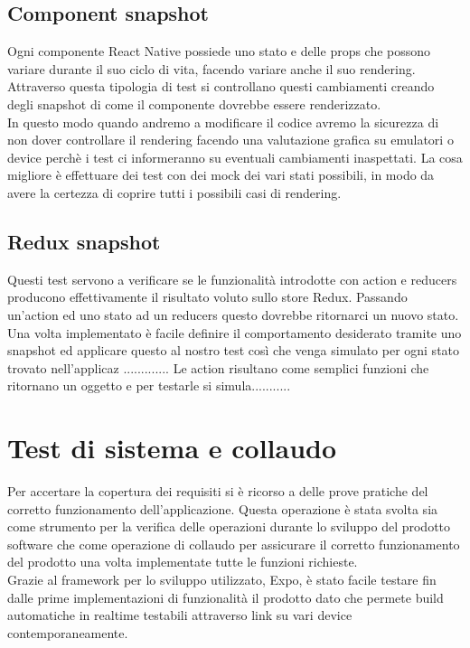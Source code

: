 \subsection{Component snapshot}
Ogni componente React Native possiede uno stato e delle props che possono variare durante il suo ciclo di vita, facendo variare anche il suo rendering. Attraverso questa tipologia di test si controllano questi cambiamenti creando degli snapshot di come il componente dovrebbe essere renderizzato. \\
In questo modo quando andremo a modificare il codice avremo la sicurezza di non dover controllare il rendering facendo una valutazione grafica su emulatori o device perchè i test ci informeranno su eventuali cambiamenti inaspettati. La cosa migliore è effettuare dei test con dei mock dei vari stati possibili, in modo da avere la certezza di coprire tutti i possibili casi di rendering.

\subsection{Redux snapshot}
Questi test servono a verificare se le funzionalità introdotte con action e reducers producono effettivamente il risultato voluto sullo store Redux. 
Passando un'action ed uno stato ad un reducers questo dovrebbe ritornarci un nuovo stato. Una volta implementato è facile definire il comportamento desiderato tramite uno snapshot ed applicare questo al nostro test così che venga simulato per ogni stato trovato nell'applicaz .............
Le action risultano come semplici funzioni che ritornano un oggetto e per testarle si simula...........
\section{Test di sistema e collaudo}
Per accertare la copertura dei requisiti si è ricorso a delle prove pratiche del corretto funzionamento dell’applicazione. Questa operazione è stata svolta sia come strumento per la verifica delle operazioni durante lo sviluppo del prodotto software che come operazione di collaudo per assicurare il corretto funzionamento del prodotto una volta implementate tutte le funzioni richieste. \\
Grazie al framework per lo sviluppo utilizzato, Expo, è stato facile testare fin dalle prime implementazioni di funzionalità il prodotto dato che permete build automatiche in realtime testabili attraverso link su vari device contemporaneamente.
